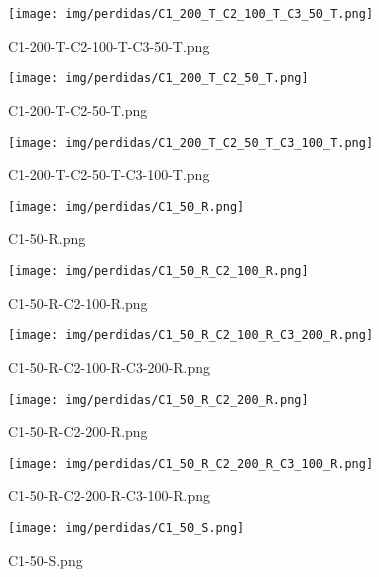 \begin{figure}[H]
    \centerline{\texttt{[image: img/perdidas/C1\_200\_T\_C2\_100\_T\_C3\_50\_T.png]}}
    \caption{C1-200-T-C2-100-T-C3-50-T.png}
    \label{fig:C1_200_T_C2_100_T_C3_50_T.png}
\end{figure}

\begin{figure}[H]
    \centerline{\texttt{[image: img/perdidas/C1\_200\_T\_C2\_50\_T.png]}}
    \caption{C1-200-T-C2-50-T.png}
    \label{fig:C1_200_T_C2_50_T.png}
\end{figure}

\begin{figure}[H]
    \centerline{\texttt{[image: img/perdidas/C1\_200\_T\_C2\_50\_T\_C3\_100\_T.png]}}
    \caption{C1-200-T-C2-50-T-C3-100-T.png}
    \label{fig:C1_200_T_C2_50_T_C3_100_T.png}
\end{figure}

\begin{figure}[H]
    \centerline{\texttt{[image: img/perdidas/C1\_50\_R.png]}}
    \caption{C1-50-R.png}
    \label{fig:C1_50_R.png}
\end{figure}

\begin{figure}[H]
    \centerline{\texttt{[image: img/perdidas/C1\_50\_R\_C2\_100\_R.png]}}
    \caption{C1-50-R-C2-100-R.png}
    \label{fig:C1_50_R_C2_100_R.png}
\end{figure}

\begin{figure}[H]
    \centerline{\texttt{[image: img/perdidas/C1\_50\_R\_C2\_100\_R\_C3\_200\_R.png]}}
    \caption{C1-50-R-C2-100-R-C3-200-R.png}
    \label{fig:C1_50_R_C2_100_R_C3_200_R.png}
\end{figure}

\begin{figure}[H]
    \centerline{\texttt{[image: img/perdidas/C1\_50\_R\_C2\_200\_R.png]}}
    \caption{C1-50-R-C2-200-R.png}
    \label{fig:C1_50_R_C2_200_R.png}
\end{figure}

\begin{figure}[H]
    \centerline{\texttt{[image: img/perdidas/C1\_50\_R\_C2\_200\_R\_C3\_100\_R.png]}}
    \caption{C1-50-R-C2-200-R-C3-100-R.png}
    \label{fig:C1_50_R_C2_200_R_C3_100_R.png}
\end{figure}

\begin{figure}[H]
    \centerline{\texttt{[image: img/perdidas/C1\_50\_S.png]}}
    \caption{C1-50-S.png}
    \label{fig:C1_50_S.png}
\end{figure}

